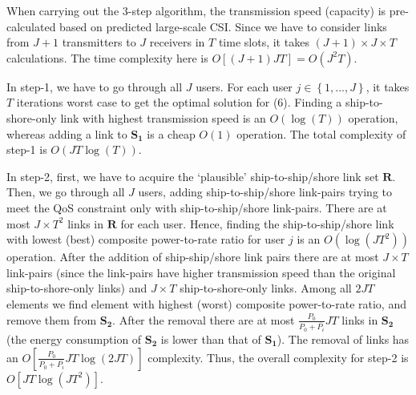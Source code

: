 \documentclass[conference]{IEEEtran}
\begin{document}
 When carrying out the 3-step algorithm, the transmission speed (capacity) is pre-calculated based on predicted large-scale CSI. Since we have to consider links from $J+1$ transmitters to $J$ receivers in $T$ time slots, it takes $\left( {J + 1} \right) \times J \times T$ calculations. The time complexity here is $O\left[ {\left( {J + 1} \right)JT} \right] = O\left( {{J^2}T} \right)$. 

 In step-1, we have to go through all $J$ users. For each user $j \in \left\{ {1,...,J} \right\}$, it takes $T$ iterations worst case to get the optimal solution for (6). Finding a ship-to-shore-only link with highest transmission speed is an $O\left( \log \left( T \right) \right)$ operation, whereas adding a link to ${{\mathbf{S}}_{\mathbf{1}}}$ is a cheap $O\left( 1 \right)$ operation. The total complexity of step-1 is $O\left( J T\log \left( T \right) \right)$.

 In step-2, first, we have to acquire the `plausible' ship-to-ship/shore link set ${\mathbf{R}}$. %
 Then, we go through all $J$ users, adding ship-to-ship/shore link-pairs trying to meet the QoS constraint only with ship-to-ship/shore link-pairs. There are at most $J \times T^2$ links in ${\mathbf{R}}$ for each user. Hence, finding the ship-to-ship/shore link with lowest (best) composite power-to-rate ratio for user $j$ is an $O\left( \log \left( JT^2 \right) \right)$ operation. 
 After the addition of ship-ship/shore link pairs there are at most $J \times T$ link-pairs (since the link-pairs have higher transmission speed than the original ship-to-shore-only links) and 
 $J \times T$ ship-to-shore-only links. 
 Among all ${2J}T$ elements we find element with highest (worst) composite power-to-rate ratio, and remove them from ${{\mathbf{S}}_{\mathbf{2}}}$. After the removal there are at most $\frac{{{P_0}}}{{{P_0} + \overline {{P_i}} }} { J} T$ links in ${{\mathbf{S}}_{\mathbf{2}}}$ (the energy consumption of ${{\mathbf{S}}_{\mathbf{2}}}$ is lower than that of ${{\mathbf{S}}_{\mathbf{1}}}$). 
 The removal of links has an $O\left[ \frac{{{P_0}}}{{{P_0} + \overline {{P_i}} }} { J} T \log \left( { {2J} T} \right)  \right]$ complexity. 
 Thus, the overall complexity for step-2 is $O\left[ {JT \log \left( JT^2 \right)} \right]$. 
\end{document}
